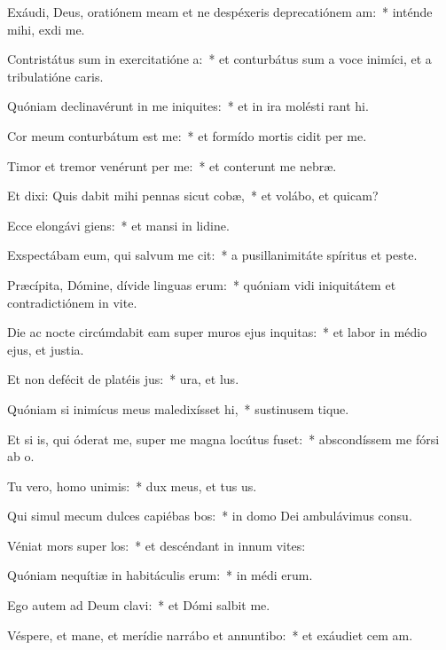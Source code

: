 \item Exáudi, Deus, oratiónem meam et ne despéxeris deprecatiónem am:~* inténde mihi,  exdi me.
\item Contristátus sum in exercitatióne a:~* et conturbátus sum a voce inimíci, et a tribulatióne caris.
\item Quóniam declinavérunt in me iniquites:~* et in ira molésti rant hi.
\item Cor meum conturbátum est  me:~* et formído mortis cidit per me.
\item Timor et tremor venérunt per me:~* et conterunt me nebræ.
\item Et dixi: Quis dabit mihi pennas sicut cobæ,~* et volábo, et quicam?
\item Ecce elongávi giens:~* et mansi in lidine.
\item Exspectábam eum, qui salvum me cit:~* a pusillanimitáte spíritus et peste.
\item Præcípita, Dómine, dívide linguas erum:~* quóniam vidi iniquitátem et contradictiónem in vite.
\item Die ac nocte circúmdabit eam super muros ejus inquitas:~* et labor in médio ejus, et justia.
\item Et non defécit de platéis jus:~* ura, et lus.
\item Quóniam si inimícus meus maledixísset hi,~* sustinusem tique.
\item Et si is, qui óderat me, super me magna locútus fuset:~* abscondíssem me fórsi ab o.
\item Tu vero, homo unimis:~* dux meus, et tus us.
\item Qui simul mecum dulces capiébas bos:~* in domo Dei ambulávimus  consu.
\item Véniat mors super los:~* et descéndant in innum vites:
\item Quóniam nequítiæ in habitáculis erum:~* in médi erum.
\item Ego autem ad Deum clavi:~* et Dómi salbit me.
\item Véspere, et mane, et merídie narrábo et annuntibo:~* et exáudiet cem am.
